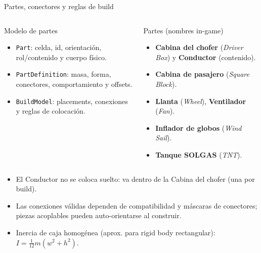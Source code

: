 \documentclass[aspectratio=169,11pt]{beamer}
\begin{document}
\begin{frame}{Partes, conectores y reglas de build}
  \begin{columns}[T]
    \begin{block}{Modelo de partes}
      \begin{itemize}
        \item \texttt{Part}: celda, id, orientación, rol/contenido y cuerpo físico.
        \item \texttt{PartDefinition}: masa, forma, conectores, comportamiento y offsets.
        \item \texttt{BuildModel}: placements, conexiones y reglas de colocación.
      \end{itemize}
    \end{block}
    \begin{block}{Partes (nombres in-game)}
      \begin{itemize}
        \item \textbf{Cabina del chofer} (\emph{Driver Box}) y \textbf{Conductor} (contenido).
        \item \textbf{Cabina de pasajero} (\emph{Square Block}).
        \item \textbf{Llanta} (\emph{Wheel}), \textbf{Ventilador} (\emph{Fan}).
        \item \textbf{Inflador de globos} (\emph{Wind Sail}).
        \item \textbf{Tanque SOLGAS} (\emph{TNT}).
      \end{itemize}
    \end{block}
  \end{columns}

  \vspace{0.1cm}
  \begin{itemize}
    \item El Conductor no se coloca suelto: va dentro de la Cabina del chofer (una por build).
    \item Las conexiones válidas dependen de compatibilidad y máscaras de conectores; piezas acoplables pueden auto-orientarse al construir.
    \item Inercia de caja homogénea (aprox. para rigid body rectangular): \(
      I = \frac{1}{12}m(w^2+h^2).
    \)
  \end{itemize}
\end{frame}
\end{document}

